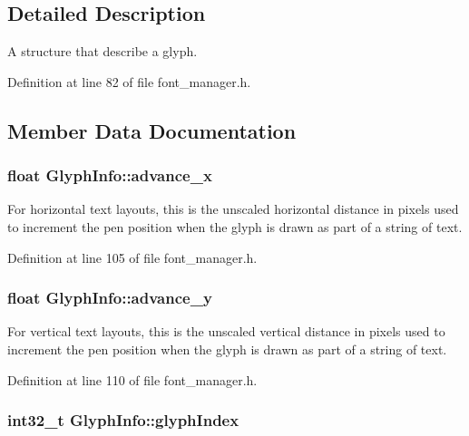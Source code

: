 \subsection{Detailed Description}
A structure that describe a glyph. 

Definition at line 82 of file font\+\_\+manager.\+h.



\subsection{Member Data Documentation}
\hypertarget{struct_glyph_info_ac7542ec73906552cf31d9b4ce0749d0c}{
\subsubsection[{advance\+\_\+x}]{\setlength{\rightskip}{0pt plus 5cm}float Glyph\+Info\+::advance\+\_\+x}}\label{struct_glyph_info_ac7542ec73906552cf31d9b4ce0749d0c}
For horizontal text layouts, this is the unscaled horizontal distance in pixels used to increment the pen position when the glyph is drawn as part of a string of text. 

Definition at line 105 of file font\+\_\+manager.\+h.

\hypertarget{struct_glyph_info_a30498d3b9435d104130fcfd2829d2817}{
\subsubsection[{advance\+\_\+y}]{\setlength{\rightskip}{0pt plus 5cm}float Glyph\+Info\+::advance\+\_\+y}}\label{struct_glyph_info_a30498d3b9435d104130fcfd2829d2817}
For vertical text layouts, this is the unscaled vertical distance in pixels used to increment the pen position when the glyph is drawn as part of a string of text. 

Definition at line 110 of file font\+\_\+manager.\+h.

\hypertarget{struct_glyph_info_ab597d9409c28f3e07b2d7158646faa3c}{
\subsubsection[{glyph\+Index}]{\setlength{\rightskip}{0pt plus 5cm}int32\+\_\+t Glyph\+Info\+::glyph\+Index}}\label{struct_glyph_info_ab597d9409c28f3e07b2d7158646faa3c}


